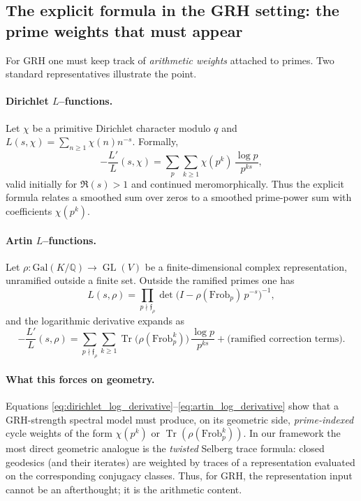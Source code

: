 \documentclass[11pt,oneside]{amsbook}
\numberwithin{equation}{section}
\theoremstyle{plain}
\theoremstyle{definition}
\theoremstyle{remark}
\DeclareMathOperator{\Tr}{\mathrm{Tr}}
\DeclareMathOperator{\GL}{\mathrm{GL}}
\begin{document}
\subsection{The explicit formula in the GRH setting: the prime weights that must appear}
\label{sec:explicit_formula_GRH}

For GRH one must keep track of \emph{arithmetic weights} attached to primes.
Two standard representatives illustrate the point.

\paragraph{Dirichlet $L$--functions.}
Let $\chi$ be a primitive Dirichlet character modulo $q$ and $L(s,\chi)=\sum_{n\ge 1}\chi(n)n^{-s}$.
Formally,
\begin{equation}
\label{eq:dirichlet_log_derivative}
-\frac{L'}{L}(s,\chi)=\sum_{p}\sum_{k\ge 1}\chi(p^k)\,\frac{\log p}{p^{ks}},
\end{equation}
valid initially for $\Re(s)>1$ and continued meromorphically.
Thus the explicit formula relates a smoothed sum over zeros to a smoothed prime-power sum with coefficients $\chi(p^k)$.

\paragraph{Artin $L$--functions.}
Let $\rho:\mathrm{Gal}(K/\mathbb{Q})\to \GL(V)$ be a finite-dimensional complex representation, unramified outside a finite set.
Outside the ramified primes one has
\[
L(s,\rho)=\prod_{p\nmid \mathfrak{f}_\rho}\det\!\bigl(I-\rho(\mathrm{Frob}_p)\,p^{-s}\bigr)^{-1},
\]
and the logarithmic derivative expands as
\begin{equation}
\label{eq:artin_log_derivative}
-\frac{L'}{L}(s,\rho)=\sum_{p\nmid \mathfrak{f}_\rho}\sum_{k\ge 1}\Tr\!\bigl(\rho(\mathrm{Frob}_p^k)\bigr)\,\frac{\log p}{p^{ks}}+\text{(ramified correction terms)}.
\end{equation}

\paragraph{What this forces on geometry.}
Equations \eqref{eq:dirichlet_log_derivative}--\eqref{eq:artin_log_derivative} show that a GRH-strength spectral model must produce, on its geometric side, \emph{prime-indexed} cycle weights of the form $\chi(p^k)$ or $\Tr(\rho(\mathrm{Frob}_p^k))$.
In our framework the most direct geometric analogue is the \emph{twisted} Selberg trace formula:
closed geodesics (and their iterates) are weighted by traces of a representation evaluated on the corresponding conjugacy classes.
Thus, for GRH, the representation input cannot be an afterthought; it is the arithmetic content.
\end{document}
